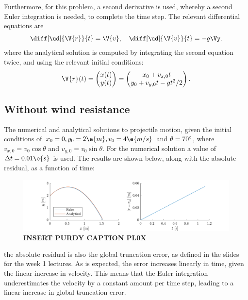\documentclass[a4paper,10pt]{article} 	%
\numberwithin{equation}{section}
\begin{document}
	Furthermore, for this problem, a second derivative is used, whereby a second Euler integration is needed, to complete the time step. The relevant differential equations are
	\begin{equation}
		\diff[\ud]{\V{r}}{t} = \V{v}, \quad \diff[\ud]{\V{v}}{t} = -g\Vy.
	\end{equation}
	where the analytical solution is computed by integrating the second equation twice, and using the relevant initial conditions:
	\begin{equation}
		\V{r}(t) = \begin{pmatrix}
		x(t) \\ y(t)
		\end{pmatrix} = \begin{pmatrix}
		x_0+v_{x,0} t \\ y_0+v_{y,0}t-gt^2/2
		\end{pmatrix}. 
	\end{equation}
	
	
	\subsection{Without wind resistance}
	The numerical and analytical solutions to projectile motion, given the initial conditions of $ x_0 = 0,y_0 = 2 \e{m},v_0 = 4 \e{m/s}$ and $ \theta = 70\degree$, where $ v_{x,0} = v_0 \cos \theta $ and $ v_{y,0} = v_0 \sin \theta $. For the numerical solution a value of $ \Delta t = 0.01 \e{s}$ is used. The results are shown below, along with the absolute residual, as a function of time:
	\begin{figure}[H]
		\centering
		\includegraphics[width=\linewidth]{projectile.pdf}
		\caption{\textbf{INSERT PURDY CAPTION PL0X}}
		\label{fig:projectile}
	\end{figure}
	the absolute residual is also the global truncation error, as defined in the slides for the week 1 lectures. As is expected, the error increases linearly in time, given the linear increase in velocity. This means that the Euler integration underestimates the velocity by a constant amount per time step, leading to a linear increase in global truncation error.
	
\end{document}
